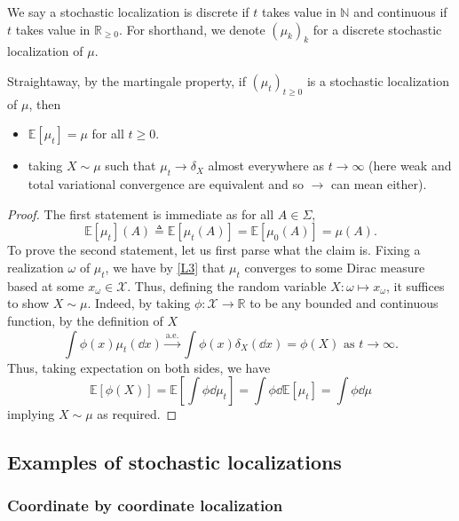 We say a stochastic localization is discrete if \(t\) takes value in \(\mathbb{N}\) and continuous 
if \(t\) takes value in \(\mathbb{R}_{\ge 0}\). For shorthand, we denote \((\mu_k)_k\) for a
discrete stochastic localization of \(\mu\).

\begin{proposition}\label{prop:stoch_loc}
  Straightaway, by the martingale property, if \((\mu_t)_{t \ge 0}\) is a stochastic localization of \(\mu\), 
  then 
  \begin{itemize}
    \item \(\mathbb{E}[\mu_t] = \mu\) for all \(t \ge 0\).
    \item taking \(X \sim \mu\) such that \(\mu_t \to \delta_X\) almost everywhere as \(t \to \infty\) 
      (here weak and total variational convergence are equivalent and so \(\to\) can mean either).
  \end{itemize}
\end{proposition}
\begin{proof}
  The first statement is immediate as for all \(A \in \Sigma\), 
  \[\mathbb{E}[\mu_t](A) \triangleq \mathbb{E}[\mu_t(A)] = \mathbb{E}[\mu_0(A)] = \mu(A).\]
  To prove the second statement, let us first parse what the claim is. Fixing a realization \(\omega\) of \(\mu_t\), 
  we have by \ref{L3} that \(\mu_t\) converges to some Dirac measure based at some \(x_\omega \in \mathcal{X}\). Thus, 
  defining the random variable \(X : \omega \mapsto x_\omega\), it suffices to show \(X \sim \mu\). 
  Indeed, by taking \(\phi : \mathcal{X} \to \mathbb{R}\) to be any bounded and continuous function, by the 
  definition of \(X\)
  \[\int \phi(x) \mu_t(\dd x) \xrightarrow{\text{a.e.}} \int \phi(x) \delta_{X}(\dd x) = \phi(X) \text{ as } t \to \infty.\]
  Thus, taking expectation on both sides, we have 
  \[\mathbb{E}[\phi(X)] = \mathbb{E}\left[\int \phi \dd \mu_t\right] = 
    \int \phi \dd \mathbb{E}[\mu_t] = \int \phi \dd \mu\]
  implying \(X \sim \mu\) as required.
\end{proof}

\subsection{Examples of stochastic localizations}

\subsubsection{Coordinate by coordinate localization}

